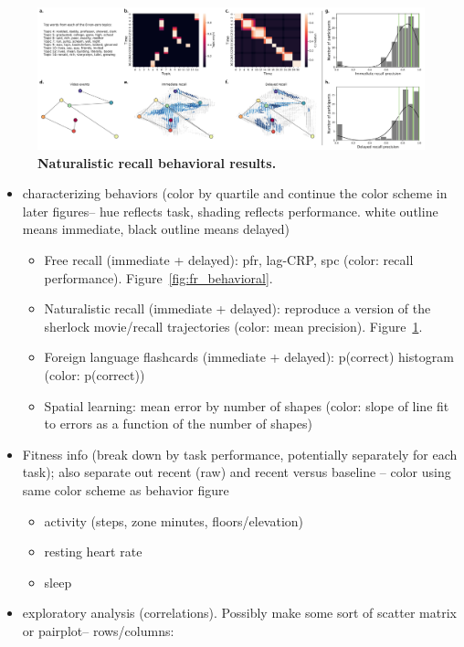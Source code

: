 \documentclass[10pt]{article}
\begin{document}
\begin{figure}[tp]
\centering
\includegraphics[width=1\textwidth]{figs/naturalistic_recall_behavior}
\caption{\textbf{Naturalistic recall behavioral results.}}
\label{fig:nat_behavioral}
\end{figure}

\begin{itemize}
\item characterizing behaviors (color by quartile and continue the
  color scheme in later figures-- hue reflects task, shading reflects
  performance.  white outline means immediate, black outline means delayed)
  \begin{itemize}
  \item Free recall (immediate + delayed): pfr, lag-CRP, spc  (color:
    recall performance).  
    Figure~\ref{fig:fr_behavioral}.
    \item Naturalistic recall (immediate + delayed): reproduce a version of the sherlock
      movie/recall trajectories (color: mean precision).  Figure~\ref{fig:nat_behavioral}.
    \item Foreign language flashcards (immediate + delayed): p(correct) histogram (color: p(correct))
      \item Spatial learning: mean error by number of shapes (color:
        slope of line fit to errors as a function of the number of
        shapes)
      \end{itemize}
    \item Fitness info (break down by task performance, potentially
      separately for each task); also separate out recent (raw) and
      recent versus baseline -- color using same color scheme as
      behavior figure
      \begin{itemize}
      \item activity (steps, zone minutes, floors/elevation)
      \item resting heart rate
        \item sleep
        \end{itemize}
  \item exploratory analysis (correlations).  Possibly make some sort of scatter matrix or pairplot-- rows/columns:

\end{itemize}
\end{document}
